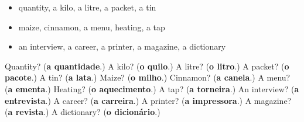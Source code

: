 \begin{itemize}
\raggedright
  \item quantity, a kilo, a litre, a packet, a tin
  \item maize, cinnamon, a menu, heating, a tap
  \item an interview, a career, a printer, a magazine, a dictionary
\end{itemize}

\begin{tcolorbox}[breakable,colback=teal!4,colframe=teal!35!black,title={Before you move on}]
Quantity? (\textbf{a quantidade}.) A kilo? (\textbf{o quilo}.) A litre? (\textbf{o litro}.) A packet? (\textbf{o pacote}.) A tin? (\textbf{a lata}.) Maize? (\textbf{o milho}.) Cinnamon? (\textbf{a canela}.) A menu? (\textbf{a ementa}.) Heating? (\textbf{o aquecimento}.) A tap? (\textbf{a torneira}.) An interview? (\textbf{a entrevista}.) A career? (\textbf{a carreira}.) A printer? (\textbf{a impressora}.) A magazine? (\textbf{a revista}.) A dictionary? (\textbf{o dicionário}.)
\end{tcolorbox}
